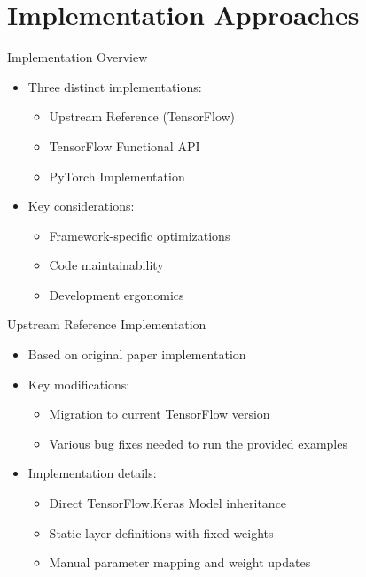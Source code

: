 \documentclass{beamer}
\begin{document}
\section{Implementation Approaches}
\begin{frame}{Implementation Overview}
    \begin{itemize}
        \item Three distinct implementations:
        \begin{itemize}
            \item Upstream Reference (TensorFlow)
            \item TensorFlow Functional API
            \item PyTorch Implementation
        \end{itemize}
        \item Key considerations:
        \begin{itemize}
            \item Framework-specific optimizations
            \item Code maintainability
            \item Development ergonomics
        \end{itemize}
    \end{itemize}
\end{frame}

\begin{frame}{Upstream Reference Implementation}
    \begin{itemize}
        \item Based on original paper implementation
        \item Key modifications:
        \begin{itemize}
            \item Migration to current TensorFlow version
            \item Various bug fixes needed to run the provided examples
        \end{itemize}
        \item Implementation details:
        \begin{itemize}
            \item Direct TensorFlow.Keras Model inheritance
            \item Static layer definitions with fixed weights
            \item Manual parameter mapping and weight updates
        \end{itemize}
    \end{itemize}
\end{frame}
\end{document}
